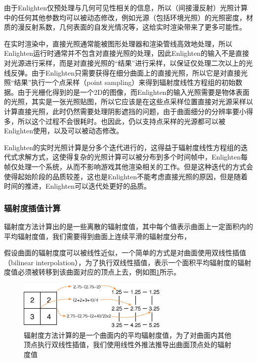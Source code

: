由于Enlighten仅预处理与几何可见性相关的信息，所以（间接漫反射）光照计算中的任何其他参数均可以被动态修改，例如光源（包括环境光照）的光照密度，材质的漫反射系数，几何表面的自发光情况等，这给实时渲染带来了更多可能性。

在实时渲染中，直接光照通常能被图形处理器和渲染管线高效地处理，所以Enlighten运行时通常并不包含对直接光照的处理，因此Enlighten的输入不是直接对光源进行采样，而是对直接光照的“结果”进行采样，以保证仅处理二次以上的光线反弹。由于Enlighten只需要获得在细分曲面上的直接光照，所以它是对直接光照“结果”执行一个点采样（point sampling）来得到辐射度线性方程组的初始数据。由于光栅化得到的是一个2D的图像，而Enlighten的输入光照需要是物体表面的光照，其实是一张光照贴图，所以它应该是在这些点采样位置直接对光源采样以计算直接光照，此时仍然需要处理阴影遮挡的问题，由于曲面细分的分辨率要小得多，所以这个过程不会很耗时。也因此，仍以支持点采样的光源都可以被Enlighten使用，以及可以被动态修改。

Enlighten的实时光照计算是分多个迭代进行的，这得益于辐射度线性方程组的迭代式求解方式，这使得复杂的光照计算可以被分布到多个时间帧中，Enlighten每帧仅处理一个系统，从而不影响游戏其他渲染相关的工作。但是这种迭代的方式会使得起始阶段的品质较差，这也是Enlighten不能考虑直接光照的原因，但是随着时间的推进，Enlighten可以迭代处更好的品质。




\subsubsection{辐射度插值计算}
辐射度方法计算出的是一些离散的辐射度值，其中每个值表示曲面上一定面积内的平均辐射度值，我们需要得到曲面上连续平滑的辐射度分布，

假设曲面的辐射度度可以被线性近似，一个简单的方式是对曲面使用双线性插值（bilinear interpolation），为了执行双线性插值，表示一个面积平均辐射度的辐射度值必须被转移到该曲面对应的顶点上去，例如图\ref{f:r-linear-extrapolation}所示。

\begin{figure}
\sidecaption
\includegraphics[width=0.65\textwidth]{figures/r/linear-extrapolation}
	\caption{辐射度方法计算的是一个曲面内的平均辐射度值，为了对曲面内其他顶点执行双线性插值，我们使用线性外推法推导出曲面顶点处的辐射度值}
	\label{f:r-linear-extrapolation}
\end{figure}


